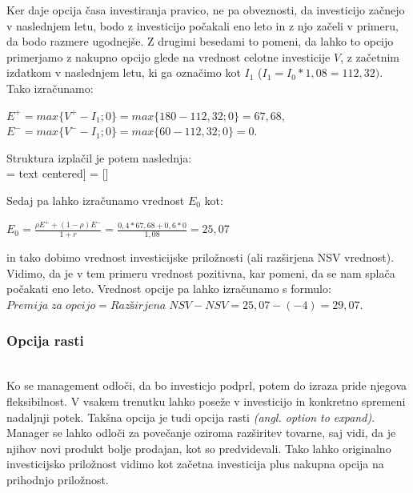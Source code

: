 Ker daje opcija časa investiranja pravico, ne pa obveznosti, da investicijo začnejo v naslednjem letu, bodo z investicijo počakali eno leto in z njo začeli v primeru, da bodo razmere ugodnejše. Z drugimi besedami to pomeni, da lahko to opcijo primerjamo z nakupno opcijo glede na vrednost celotne investicije $V$, z začetnim izdatkom v naslednjem letu, ki ga označimo kot $I_1$ ($I_1 = I_0*1,08 = 112,32)$.  Tako izračunamo:
 \begin{center}
$E^+ = max\{V^+ - I_1; 0\} = max\{180 - 112,32; 0\} = 67,68$,\\[0,5 cm]
$E^- = max\{V^- - I_1; 0\} = max\{60 - 112,32; 0\} = 0.$
\end{center}
Struktura izplačil je potem naslednja: \\

 =  text centered]
 = []


Sedaj pa lahko izračunamo vrednost $E_0$ kot: 
 \begin{center}
$E_0 = \tfrac{\rho E^+ + (1-\rho)E^-}{1+r} = \tfrac{0,4 * 67,68 + 0,6 * 0}{1,08} = 25,07 $
\end{center}
in tako dobimo vrednost investicijske priložnosti (ali razširjena NSV vrednost). Vidimo, da je v tem primeru vrednost pozitivna, kar pomeni, da se nam splača počakati eno leto. Vrednost opcije pa lahko izračunamo s formulo:\\[0,5 cm]
$Premija\;za\; opcijo = Razširjena\; NSV - NSV = 25,07 - (-4) = 29,07. $\\

\subsubsection{Opcija rasti}
\cite[str. 162, 163]{Trigeorgis}\\
Ko se management odloči, da bo investicjo podprl, potem do izraza pride njegova fleksibilnost. V vsakem trenutku lahko poseže v investicijo in konkretno spremeni nadaljnji potek. Takšna opcija je tudi opcija rasti \textit{(angl. option to expand)}. Manager se lahko odloči za povečanje oziroma razširitev tovarne, saj vidi, da je njihov novi produkt bolje prodajan, kot so predvidevali. Tako lahko originalno investicijsko priložnost vidimo kot začetna investicija plus nakupna opcija na prihodnjo priložnost.\\

